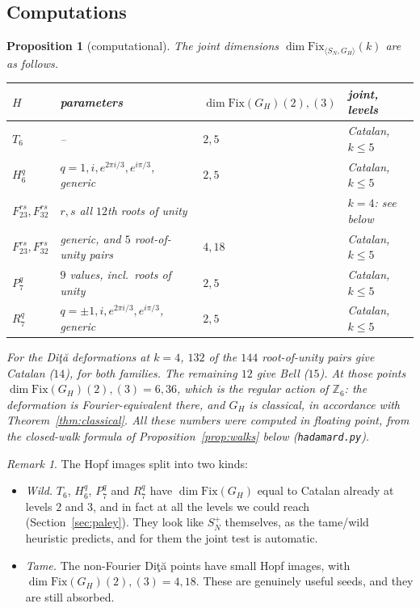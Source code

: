\documentclass[11pt]{amsart}
\newtheorem{proposition}[theorem]{Proposition}
\theoremstyle{definition}
\theoremstyle{remark}
\newtheorem{remark}[theorem]{Remark}
\theoremstyle{plain}
\numberwithin{equation}{section}
\numberwithin{table}{section}
\newcommand{\Z}{\mathbb Z}
\newcommand{\Fix}{\mathrm{Fix}}
\begin{document}
\subsection{Computations}

\begin{proposition}[computational]\label{prop:hadres}
The joint dimensions $\dim\Fix_{\langle S_N,G_H\rangle}(k)$ are as follows.
\begin{center}\small
\setlength{\tabcolsep}{4pt}
\begin{tabular}{@{}llll@{}}\toprule
$H$ & parameters & $\dim\Fix(G_H)(2),(3)$ & joint, levels\\\midrule
$T_6$ & -- & $2,5$ & Catalan, $k\le5$\\
$H_6^q$ & $q=1,i,e^{2\pi i/3},e^{i\pi/3}$, generic & $2,5$ & Catalan, $k\le5$\\
$F_{23}^{rs},F_{32}^{rs}$ & $r,s$ all $12$th roots of unity & & $k=4$: see below\\
$F_{23}^{rs},F_{32}^{rs}$ & generic, and $5$ root-of-unity pairs & $4,18$ & Catalan, $k\le5$\\
$P_7^q$ & $9$ values, incl.\ roots of unity & $2,5$ & Catalan, $k\le5$\\
$R_7^q$ & $q=\pm1,i,e^{2\pi i/3},e^{i\pi/3}$, generic & $2,5$ & Catalan, $k\le5$\\\bottomrule
\end{tabular}
\end{center}
For the Di{\c t}{\u a} deformations at $k=4$, $132$ of the $144$ root-of-unity pairs give Catalan ($14$), for both families. The remaining $12$ give Bell ($15$). At those points $\dim\Fix(G_H)(2),(3)=6,36$, which is the regular action of $\Z_6$: the deformation is Fourier-equivalent there, and $G_H$ is classical, in accordance with Theorem~\ref{thm:classical}. All these numbers were computed in floating point, from the closed-walk formula of Proposition~\ref{prop:walks} below (\texttt{hadamard.py}).
\end{proposition}

\begin{remark}
The Hopf images split into two kinds:
\begin{itemize}
\item \emph{Wild.} $T_6$, $H_6^q$, $P_7^q$ and $R_7^q$ have $\dim\Fix(G_H)$ equal to Catalan already at levels $2$ and $3$, and in fact at all the levels we could reach (Section~\ref{sec:paley}). They look like $S_N^+$ themselves, as the tame/wild heuristic predicts, and for them the joint test is automatic.
\item \emph{Tame.} The non-Fourier Di{\c t}{\u a} points have small Hopf images, with $\dim\Fix(G_H)(2),(3)=4,18$. These are genuinely useful seeds, and they are still absorbed.
\end{itemize}
\end{remark}
\end{document}
